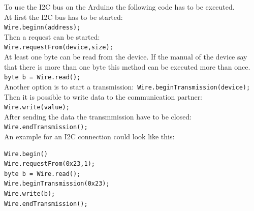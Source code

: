 To use the I2C bus on the Arduino the following code has to be executed.\\
At first the I2C bus has to be started: \\
\lstinline|Wire.beginn(address);| \\
Then a request can be started: \\
\lstinline|Wire.requestFrom(device,size);| \\
At least one byte can be read from the device.
If the manual of the device say that there is more than one byte this method can be executed more than once. \\
\lstinline|byte b = Wire.read();| \\
Another option is to start a transmission:\
\lstinline|Wire.beginTransmission(device);| \\
Then it is possible to write data to the communication partner:\\
\lstinline|Wire.write(value);|\\
After sending the data the transmmission have to be closed:\\
\lstinline|Wire.endTransmission();|\\
An example for an I2C connection could look like this:\\
\begin{lstlisting}
Wire.begin()
Wire.requestFrom(0x23,1);
byte b = Wire.read();
Wire.beginTransmission(0x23);
Wire.write(b);
Wire.endTransmission();
\end{lstlisting}
